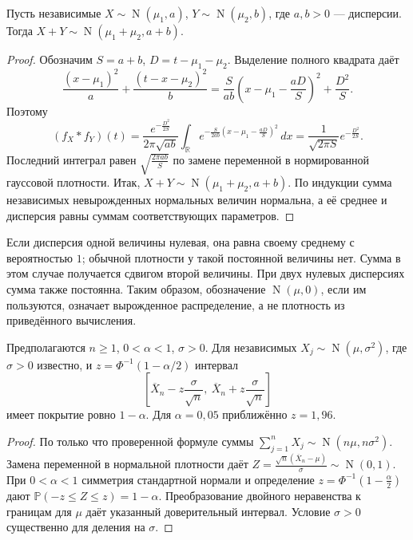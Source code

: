 \noindent\usebox{\CatFlowBox}\par\addvspace{5pt}
\begin{theorem}\label{thm:normal-convolution}
Пусть независимые \(X\sim\operatorname N(\mu_1,a)\),
\(Y\sim\operatorname N(\mu_2,b)\), где \(a,b>0\) --- дисперсии.
Тогда \(X+Y\sim\operatorname N(\mu_1+\mu_2,a+b)\).\end{theorem}\begin{proof}
Обозначим \(S=a+b\), \(D=t-\mu_1-\mu_2\).
Выделение полного квадрата даёт
\[
 \frac{(x-\mu_1)^2}{a}+\frac{(t-x-\mu_2)^2}{b}
 =\frac{S}{ab}\left(x-\mu_1-\frac{aD}{S}\right)^2+\frac{D^2}{S}.
\]
Поэтому
\[
 (f_X*f_Y)(t)
 =\frac{e^{-\frac{D^2}{2S}}}{2\pi\sqrt{ab}}
   \int_{\mathbb R}
   e^{-\frac{S}{2ab}\left(x-\mu_1-\frac{aD}{S}\right)^2}\,dx
 =\frac{1}{\sqrt{2\pi S}}e^{-\frac{D^2}{2S}}.
\]
Последний интеграл равен \(\sqrt{\frac{2\pi ab}{S}}\) по замене переменной
в нормированной гауссовой плотности.
Итак, \(X+Y\sim\operatorname N(\mu_1+\mu_2,a+b)\).
По индукции сумма независимых невырожденных нормальных величин нормальна,
а её среднее и дисперсия равны суммам соответствующих параметров.\qedhere\end{proof}
Если дисперсия одной величины нулевая, она равна своему среднему с вероятностью \(1\);
обычной плотности у такой постоянной величины нет.
Сумма в этом случае получается сдвигом второй величины.
При двух нулевых дисперсиях сумма также постоянна.
Таким образом, обозначение \(\operatorname N(\mu,0)\), если им пользуются,
означает вырожденное распределение, а не плотность из приведённого вычисления.
\begin{theorem}
Предполагаются \(n\ge1\), \(0<\alpha<1\), \(\sigma>0\).
Для независимых \(X_j\sim\operatorname N(\mu,\sigma^2)\), где \(\sigma>0\) известно, и \(z=\Phi^{-1}(1-\alpha/2)\) интервал
\[
\left[\overline X_n-z\frac\sigma{\sqrt n},\ \overline X_n+z\frac\sigma{\sqrt n}\right]
\]
имеет покрытие ровно \(1-\alpha\). Для \(\alpha=0{,}05\) приближённо \(z=1{,}96\).
\end{theorem}
\begin{proof}
По только что проверенной формуле суммы
\(\sum_{j=1}^nX_j\sim\operatorname N(n\mu,n\sigma^2)\).
Замена переменной в нормальной плотности даёт
\(Z=\frac{\sqrt n(\overline X_n-\mu)}{\sigma}\sim\operatorname N(0,1)\).
При \(0<\alpha<1\) симметрия стандартной нормали и определение
\(z=\Phi^{-1}(1-\frac{\alpha}{2})\) дают
\(\mathbb P(-z\le Z\le z)=1-\alpha\).
Преобразование двойного неравенства к границам для \(\mu\)
даёт указанный доверительный интервал.
Условие \(\sigma>0\) существенно для деления на \(\sigma\).
\end{proof}
